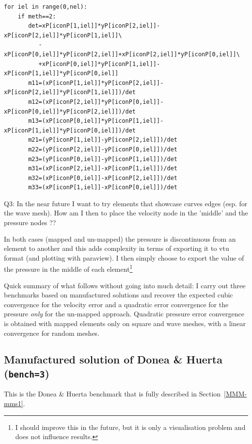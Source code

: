 \begin{lstlisting}
for iel in range(0,nel):
    if meth==2:
       det=xP[iconP[1,iel]]*yP[iconP[2,iel]]-xP[iconP[2,iel]]*yP[iconP[1,iel]]\
          -xP[iconP[0,iel]]*yP[iconP[2,iel]]+xP[iconP[2,iel]]*yP[iconP[0,iel]]\
          +xP[iconP[0,iel]]*yP[iconP[1,iel]]-xP[iconP[1,iel]]*yP[iconP[0,iel]]
       m11=(xP[iconP[1,iel]]*yP[iconP[2,iel]]-xP[iconP[2,iel]]*yP[iconP[1,iel]])/det
       m12=(xP[iconP[2,iel]]*yP[iconP[0,iel]]-xP[iconP[0,iel]]*yP[iconP[2,iel]])/det
       m13=(xP[iconP[0,iel]]*yP[iconP[1,iel]]-xP[iconP[1,iel]]*yP[iconP[0,iel]])/det
       m21=(yP[iconP[1,iel]]-yP[iconP[2,iel]])/det
       m22=(yP[iconP[2,iel]]-yP[iconP[0,iel]])/det
       m23=(yP[iconP[0,iel]]-yP[iconP[1,iel]])/det
       m31=(xP[iconP[2,iel]]-xP[iconP[1,iel]])/det
       m32=(xP[iconP[0,iel]]-xP[iconP[2,iel]])/det
       m33=(xP[iconP[1,iel]]-xP[iconP[0,iel]])/det
\end{lstlisting}


{\color{red} Q3: In the near future I want to try elements that 
showcase curves edges (esp. for the wave mesh). How am I then to place the 
velocity node in the 'middle' and the pressure nodes ??}

In both cases (mapped and un-mapped) the pressure is discontinuous from an element to another 
and this adds complexity in terms of exporting it to vtu format (and plotting with paraview). 
I then simply choose to export the value of the pressure in the middle of 
each element\footnote{I should improve this in the future, but it is 
only a visualisation problem and does not influence results.}

Quick summary of what follows without going into 
much detail: I carry out three benchmarks based on manufactured solutions  
and recover the expected cubic convergence for the velocity error 
and a quadratic error convergence for the pressure 
\textit{only} for the un-mapped approach.
Quadratic pressure error convergence is obtained with mapped elements 
only on square and wave meshes, with a linear convergence for random meshes. 



\newpage
\subsection*{Manufactured solution of Donea \& Huerta ({\tt bench=3})}

This is the Donea \& Huerta benchmark that is fully described in Section~\ref{MMM-mms1}.

